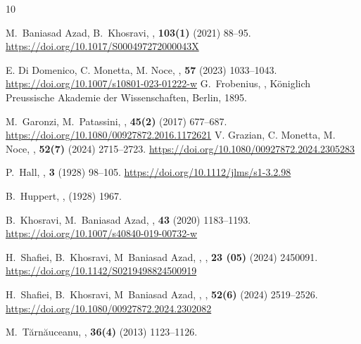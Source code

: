 \documentclass[12pt]{amsart}
\theoremstyle{definition}
\begin{document}
	\begin{thebibliography}{10}

		M.~{Baniasad Azad}, B.~{Khosravi},
		, {\bf 103(1)} (2021) 88--95.
		\url{https://doi.org/10.1017/S000497272000043X}
		
		E. Di Domenico,  C. Monetta,  M. Noce,  
		, {\bf 57} (2023) 1033–1043.
		\url{https://doi.org/10.1007/s10801-023-01222-w}
		G.~{Frobenius},
		, 
		\newblock K\"oniglich Preussische Akademie der Wissenschaften, Berlin, 1895.
		
		M.~{Garonzi}, M.~{Patassini},
		, {\bf 45(2)} (2017) 677--687.
		\url{https://doi.org/10.1080/00927872.2016.1172621}
		V. Grazian,  C. Monetta, M. Noce, 
		, {\bf 52(7)} (2024) 2715--2723.
	\url{	https://doi.org/10.1080/00927872.2024.2305283}
		
		P.~{Hall},
		, {\bf 3} (1928) 98--105.
		\url{https://doi.org/10.1112/jlms/s1-3.2.98}
		
		
        B.~{Huppert},
		, (1928) 1967.		
		
 
		B.~{Khosravi}, M.~{Baniasad Azad},
		, {\bf 43} 
		(2020) 1183--1193.
		\url{https://doi.org/10.1007/s40840-019-00732-w}
		
		H.~{Shafiei}, B.~{Khosravi}, M~{Baniasad Azad},
		,
		, {\bf 23 (05)} (2024) 2450091.
	\url{	https://doi.org/10.1142/S0219498824500919}
		
		H.~{Shafiei}, B.~{Khosravi}, M~{Baniasad Azad},
		,
		, {\bf 52(6)} (2024) 2519--2526.
		\url{https://doi.org/10.1080/00927872.2024.2302082}
		
		M.~{T\u{a}rn\u{a}uceanu},
		, {\bf 36(4)} (2013) 1123--1126.
	\end{thebibliography}
\end{document}
